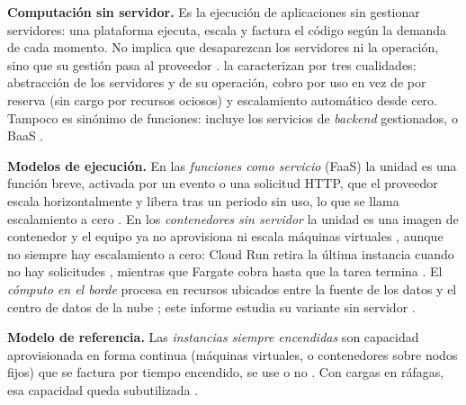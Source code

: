 \documentclass[12pt, letterpaper, table, xcdraw]{inf-pucv}
\begin{document}
\textbf{Computación sin servidor.} Es la ejecución de aplicaciones sin gestionar servidores: una plataforma ejecuta, escala y factura el código según la demanda de cada momento. No implica que desaparezcan los servidores ni la operación, sino que su gestión pasa al proveedor \parencite{cncf2018}. \textcite{schleiersmith2021} la caracterizan por tres cualidades: abstracción de los servidores y de su operación, cobro por uso en vez de por reserva (sin cargo por recursos ociosos) y escalamiento automático desde cero. Tampoco es sinónimo de funciones: incluye los servicios de \textit{backend} gestionados, o BaaS \parencite{golec2025coldstart}.

\textbf{Modelos de ejecución.} En las \textit{funciones como servicio} (FaaS) la unidad es una función breve, activada por un evento o una solicitud HTTP, que el proveedor escala horizontalmente \parencite{cncf2018,leitner2019} y libera tras un periodo sin uso, lo que se llama escalamiento a cero \parencite{golec2025coldstart}. En los \textit{contenedores sin servidor} la unidad es una imagen de contenedor y el equipo ya no aprovisiona ni escala máquinas virtuales \parencite{awsfargate}, aunque no siempre hay escalamiento a cero: Cloud Run retira la última instancia cuando no hay solicitudes \parencite{gcprun}, mientras que Fargate cobra hasta que la tarea termina \parencite{awsfargatepricing}. El \textit{cómputo en el borde} procesa en recursos ubicados entre la fuente de los datos y el centro de datos de la nube \parencite{shi2016}; este informe estudia su variante sin servidor \parencite{aslanpour2021}.

\textbf{Modelo de referencia.} Las \textit{instancias siempre encendidas} son capacidad aprovisionada en forma continua (máquinas virtuales, o contenedores sobre nodos fijos) que se factura por tiempo encendido, se use o no \parencite{ustiugov2021}. Con cargas en ráfagas, esa capacidad queda subutilizada \parencite{eismann2021}.
\end{document}
